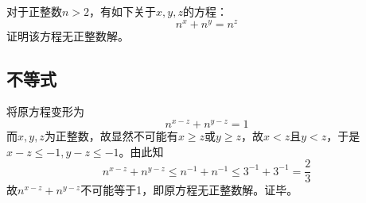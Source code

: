 

对于正整数$n > 2$，有如下关于$x, y, z$的方程：
\[ n^x + n^y = n^z \]
证明该方程无正整数解。

\subsection{不等式}

将原方程变形为
\[ n^{x - z} + n^{y - z} = 1 \]
而$x, y, z$为正整数，故显然不可能有$x \ge z$或$y \ge z$，故$x < z$且$y < z$，于是$x - z \le -1, y - z \le -1$。由此知
\[ n^{x - z} + n^{y - z} \le n^{-1} + n^{-1} \le 3^{-1} + 3^{-1} = \frac23 \]
故$n^{x - z} + n^{y - z}$不可能等于1，即原方程无正整数解。证毕。
